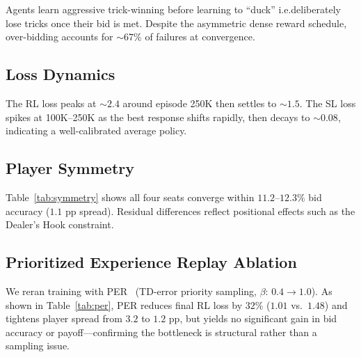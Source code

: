 \documentclass[conference]{IEEEtran}
\begin{document}
\begin{table}[!t]
\centering
\caption{\normalsize Bidding Behavior Shift During Training (Player 0)}
\label{tab:bid_shift}
\end{table}

Agents learn aggressive trick-winning before learning to ``duck'' i.e.deliberately lose tricks once their bid is met. Despite the asymmetric dense reward schedule, over-bidding accounts for $\sim\!67\%$ of failures at convergence.

\subsection{\textbf{Loss Dynamics}}

The RL loss peaks at $\sim\!2.4$ around episode 250K then settles to $\sim\!1.5$. The SL loss spikes at 100K--250K as the best response shifts rapidly, then decays to $\sim\!0.08$, indicating a well-calibrated average policy.

\subsection{\textbf{Player Symmetry}}

Table~\ref{tab:symmetry} shows all four seats converge within $11.2$--$12.3\%$ bid accuracy ($1.1$ pp spread). Residual differences reflect positional effects such as the Dealer's Hook constraint.

\subsection{\textbf{Prioritized Experience Replay Ablation}}
\label{sec:per}

We reran training with PER~\cite{schaul2016prioritized} (TD-error priority sampling, $\beta$: $0.4\to1.0$). As shown in Table~\ref{tab:per}, PER reduces final RL loss by $32\%$ ($1.01$ vs.\ $1.48$) and tightens player spread from $3.2$ to $1.2$ pp, but yields no significant gain in bid accuracy or payoff---confirming the bottleneck is structural rather than a sampling issue.
\end{document}
